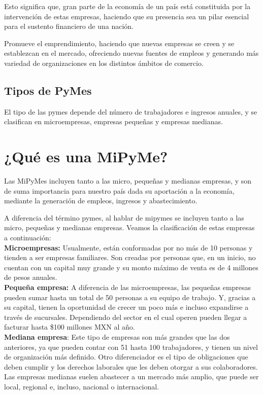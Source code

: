 \documentclass[letterpaper,12pt]{article}
\begin{document}
\begin{sloppypar}
Esto significa que, gran parte de la economía de un país está constituida por la intervención de estas empresas, haciendo que su presencia sea un pilar esencial para el sustento financiero de una nación.

Promueve el emprendimiento, haciendo que nuevas empresas se creen y se establezcan en el mercado, ofreciendo nuevas fuentes de empleos y generando más variedad de organizaciones en los distintos ámbitos de comercio.

\subsection{Tipos de PyMes}
El tipo de las pymes depende del número de trabajadores e ingresos anuales, y se clasifican en microempresas, empresas pequeñas y empresas medianas.

\section{¿Qué es una MiPyMe?}
Las MiPyMes incluyen tanto a las micro, pequeñas y medianas empresas, y son de suma importancia para nuestro país dada su aportación a la economía, mediante la generación de empleos, ingresos y abastecimiento.

A diferencia del término pymes, al hablar de mipymes se incluyen tanto a las micro, pequeñas y medianas empresas. Veamos la clasificación de estas empresas a continuación:
\vspace{0.3cm}\\ 
\textbf{Microempresas: }Usualmente, están conformadas por no más de 10 personas y tienden a ser empresas familiares. Son creadas por personas que, en un inicio, no cuentan con un capital muy grande y su monto máximo de venta es de 4 millones de pesos anuales.
\vspace{0.3cm}\\
\textbf{Pequeña empresa:} A diferencia de las microempresas, las pequeñas empresas pueden sumar hasta un total de 50 personas a su equipo de trabajo. Y, gracias a su capital, tienen la oportunidad de crecer un poco más e incluso expandirse a través de sucursales. Dependiendo del sector en el cual operen pueden llegar a facturar hasta \$100 millones MXN al año.
\vspace{0.3cm}\\
\textbf{Mediana empresa}: Este tipo de empresas son más grandes que las dos anteriores, ya que pueden contar con 51 hasta 100 trabajadores, y tienen un nivel de organización más definido. Otro diferenciador es el tipo de obligaciones que deben cumplir y los derechos laborales que les deben otorgar a sus colaboradores. Las empresas medianas suelen abastecer a un mercado más amplio, que puede ser local, regional e, incluso, nacional o internacional. 


\end{sloppypar}
\end{document}
